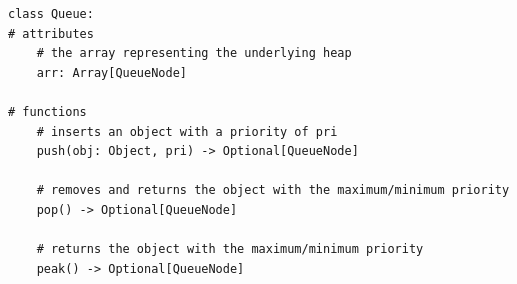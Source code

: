 \documentclass[mathserif, handout]{beamer}
\begin{document}
\begin{frame}[fragile]
  \begin{thmboxbot}
    \begin{lstlisting}[style=mypython]
class Queue:
# attributes
    # the array representing the underlying heap
    arr: Array[QueueNode]

# functions
    # inserts an object with a priority of pri
    push(obj: Object, pri) -> Optional[QueueNode]

    # removes and returns the object with the maximum/minimum priority  
    pop() -> Optional[QueueNode]

    # returns the object with the maximum/minimum priority
    peak() -> Optional[QueueNode]
\end{lstlisting}
  \end{thmboxbot}
\end{frame}
\end{document}
